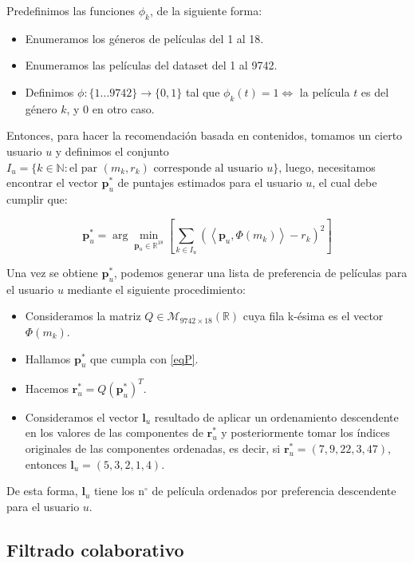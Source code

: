 \documentclass[12pt,a4paper]{article}
\begin{document}
Predefinimos las funciones \(\phi_k\), de la siguiente forma:
\begin{itemize}
  \item Enumeramos los géneros de películas del 1 al 18.
  \item Enumeramos las películas del dataset del 1 al 9742.
  \item Definimos \(\phi : \{1 \ldots 9742 \} \rightarrow \{0, 1\}\) tal que \(\phi_k(t) = 1 \Leftrightarrow\) la película \(t\) es del género \(k\), y 0 en otro caso.
\end{itemize}

Entonces, para hacer la recomendación basada en contenidos, tomamos un cierto usuario \(u\) y definimos el conjunto \(I_u = \{k \in \mathbb{N} : \text{el par } (m_k, r_k) \text{ corresponde al usuario } u \}\), luego, necesitamos encontrar el vector \(\mathbf{p}^{*}_u\) de puntajes estimados para el usuario \(u\), el cual debe cumplir que:

\begin{equation}\label{eqP}
  \mathbf{p}^{*}_u = \arg\min_{\mathbf{p}_u \in \mathbb{R}^{18} }  \left[ \sum_{k \in I_u} (\left\langle \mathbf{p}_u, \Phi(m_k) \right\rangle - r_k)^2 \right]
\end{equation}


Una vez se obtiene \(\mathbf{p}^{*}_u\), podemos generar una lista de preferencia de películas para el usuario \(u\) mediante el siguiente procedimiento:

\begin{itemize}
  \item Consideramos la matriz \(Q \in \mathcal{M}_{9742\times18}(\mathbb{R})\) cuya fila k-ésima es el vector \(\Phi(m_k)\).
  \item Hallamos \(\mathbf{p}^{*}_u\) que cumpla con \eqref{eqP}.
  \item Hacemos \(\mathbf{r}^*_u = Q (\mathbf{p}^{*}_u)^T\).
  \item Consideramos el vector \(\mathbf{l}_u\) resultado de aplicar un ordenamiento descendente en los valores de las componentes de \(\mathbf{r}^*_u\) y posteriormente tomar los índices originales de las componentes ordenadas, es decir, si \(\mathbf{r}^*_u = (7,9,22,3,47)\), entonces \(\mathbf{l}_u = (5, 3, 2, 1, 4)\).
\end{itemize}

De esta forma, \(\mathbf{l}_u\) tiene los n\(^\circ\) de película ordenados por preferencia descendente para el usuario \(u\).

\subsection*{Filtrado colaborativo}
\end{document}
